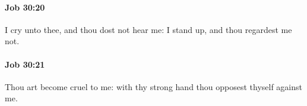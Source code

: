 		\paragraph{Job 30:20} %
			\label{JOB-30-20}

			I cry unto thee, and thou dost not hear me: I stand up, and thou regardest me not.


		\paragraph{Job 30:21} %
			\label{JOB-30-21}

			Thou art become cruel to me: with thy strong hand thou opposest thyself against me.


